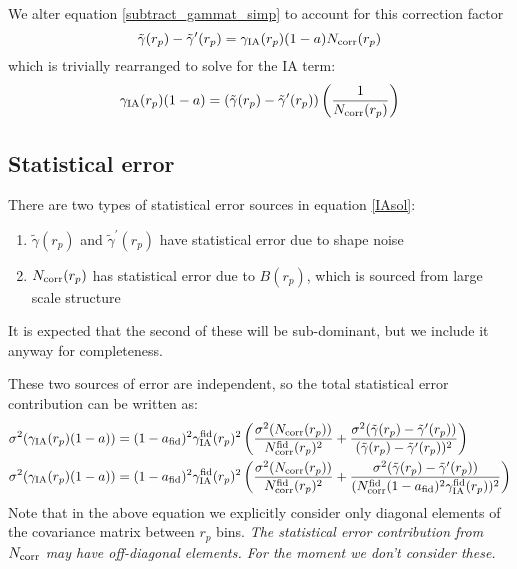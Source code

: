 \documentclass[onecolumn,amsmath,aps,fleqn, superscriptaddress]{revtex4}
\begin{document}
We alter equation \ref{subtract_gammat_simp} to account for this correction factor
\begin{equation}
\tilde{\gamma}(r_p) - \tilde{\gamma}^\prime(r_p) = \gamma_{\rm IA}(r_p)(1-a) N_{\rm corr}(r_p)
\label{subtract_gammat_fac}
\end{equation}
which is trivially rearranged to solve for the IA term:
\begin{equation}
\gamma_{\rm IA}(r_p)(1-a) = \left(\tilde{\gamma}(r_p) - \tilde{\gamma}^\prime(r_p)\right)\left(\frac{1}{N_{\rm corr}(r_p)}\right)
\label{IAsol}
\end{equation}

\subsection*{Statistical error}

There are two types of statistical error sources in equation \ref{IAsol}: 
\begin{enumerate}
\item{$\tilde{\gamma}(r_p)$ and $\tilde{\gamma}^\prime(r_p)$ have statistical error due to shape noise}
\item{$N_{\rm corr}(r_p)$ has statistical error due to $B(r_p)$, which is sourced from large scale structure}
\end{enumerate}
It is expected that the second of these will be sub-dominant, but we include it anyway for completeness. 

These two sources of error are independent, so the total statistical error contribution can be written as:
\begin{align}
\sigma^2(\gamma_{\rm IA}(r_p)(1-a)) &= (1-a_{\rm fid})^2\gamma_{\rm IA}^{\rm fid}(r_p)^2\left(\frac{\sigma^2(N_{\rm corr}(r_p))}{N_{\rm corr}^{\rm fid}(r_p)^2} + \frac{\sigma^2(\tilde{\gamma}(r_p) - \tilde{\gamma}^\prime(r_p))}{(\tilde{\gamma}(r_p) - \tilde{\gamma}^\prime(r_p))^2}\right) \nonumber \\
\sigma^2(\gamma_{\rm IA}(r_p)(1-a)) &= (1-a_{\rm fid})^2\gamma_{\rm IA}^{\rm fid}(r_p)^2\left(\frac{\sigma^2(N_{\rm corr}(r_p))}{N_{\rm corr}^{\rm fid}(r_p)^2} + \frac{\sigma^2(\tilde{\gamma}(r_p) - \tilde{\gamma}^\prime(r_p))}{(N_{\rm corr}^{\rm fid}(1-a_{\rm fid})^2\gamma_{\rm IA}^{\rm fid}(r_p))^2}\right)
\label{error}
\end{align}
Note that in the above equation we explicitly consider only diagonal elements of the covariance matrix between $r_p$ bins. {\it The statistical error contribution from $N_{\rm corr}$ may have off-diagonal elements. For the moment we don't consider these.}
\end{document}
